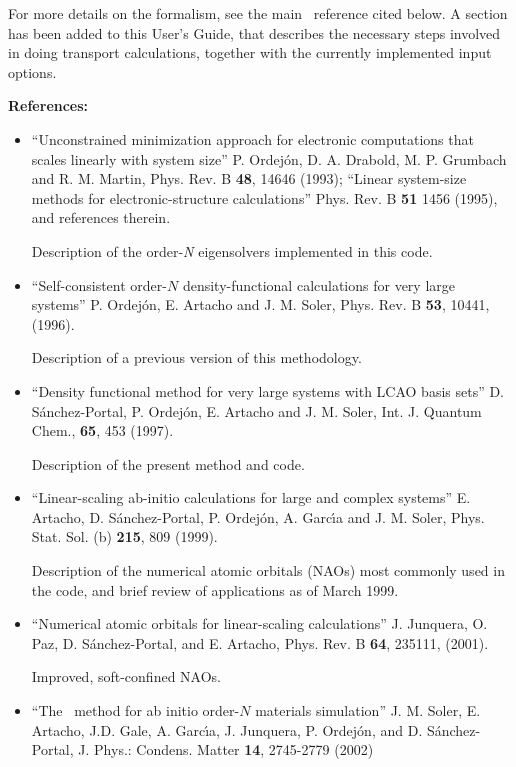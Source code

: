 For more details on the formalism, see the main \tsiesta\
reference cited below. A section has been added to this User's Guide,
that describes the necessary steps involved in doing transport
calculations, together with the currently implemented input options.

\vspace{0.5cm}
{\large \textbf{References:} }

\begin{itemize}

\item
``Unconstrained minimization approach for electronic computations
that scales linearly with system size''
P. Ordej\'on, D. A. Drabold, M. P. Grumbach and R. M. Martin,
Phys. Rev. B \textbf{48}, 14646 (1993);
``Linear system-size methods for electronic-structure calculations''
Phys. Rev. B \textbf{51} 1456 (1995), and references therein.

Description of the order-\textit{N} eigensolvers
implemented in this code.

\item
``Self-consistent order-$N$ density-functional
calculations for very large systems''
P. Ordej\'on, E. Artacho and J. M. Soler,
Phys. Rev. B \textbf{53}, 10441, (1996).

Description of a previous version of this methodology.

\item
``Density functional method for very large systems with LCAO basis sets''
D. S\'anchez-Portal, P. Ordej\'on, E. Artacho and J. M. Soler,
Int. J. Quantum Chem., \textbf{65}, 453 (1997).

Description of the present method and code.

\item
``Linear-scaling ab-initio calculations for large and complex systems''
E. Artacho, D. S\'anchez-Portal, P. Ordej\'on, A. Garc\'{\i}a and
J. M. Soler, Phys. Stat. Sol. (b) \textbf{215}, 809 (1999).

Description of the numerical atomic orbitals (NAOs) most commonly
used in the code, and brief review of applications as of March 1999.

\item
``Numerical atomic orbitals for linear-scaling calculations''
J. Junquera, O. Paz, D. S\'anchez-Portal, and E. Artacho, Phys. Rev. B
 \textbf{64}, 235111, (2001).

Improved, soft-confined NAOs.

\item
``The \siesta\ method for ab initio order-$N$ materials simulation''
J. M. Soler, E. Artacho, J.D. Gale, A. Garc\'{\i}a, J. Junquera, P. Ordej\'on,
and D. S\'anchez-Portal, J. Phys.: Condens. Matter \textbf{14}, 2745-2779 (2002)


\end{itemize}
